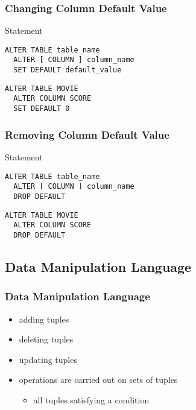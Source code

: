 \documentclass[dvipsnames]{beamer}
\theoremstyle{plain}
\begin{document}
\begin{frame}[fragile]
  \frametitle{Changing Column Default Value}

  \begin{block}{Statement}
    \begin{lstlisting}
ALTER TABLE table_name
  ALTER [ COLUMN ] column_name
  SET DEFAULT default_value
    \end{lstlisting}
  \end{block}

  \pause
  \begin{example}
    \begin{lstlisting}
ALTER TABLE MOVIE
  ALTER COLUMN SCORE
  SET DEFAULT 0
    \end{lstlisting}
  \end{example}
\end{frame}

\begin{frame}[fragile]
  \frametitle{Removing Column Default Value}

  \begin{block}{Statement}
    \begin{lstlisting}
ALTER TABLE table_name
  ALTER [ COLUMN ] column_name
  DROP DEFAULT
    \end{lstlisting}
  \end{block}

  \pause
  \begin{example}
    \begin{lstlisting}
ALTER TABLE MOVIE
  ALTER COLUMN SCORE
  DROP DEFAULT
    \end{lstlisting}
  \end{example}
\end{frame}

\subsection{Data Manipulation Language}

\begin{frame}
  \frametitle{Data Manipulation Language}

  \begin{itemize}
    \item adding tuples
    \item deleting tuples
    \item updating tuples

    \pause
    \bigskip
    \item operations are carried out on sets of tuples
    \begin{itemize}
      \item all tuples satisfying a condition
    \end{itemize}
  \end{itemize}
\end{frame}
\end{document}
